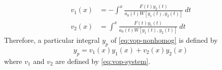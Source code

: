 \begin{equation}
    \boxed{ 
    \begin{split}
        v_1(x) &= - \int^{x} { \frac{F(t)y_2(t)}{a_0(t)W[y_1(t),y_2(t)]} } \: d{t} \\
        v_2(x) &= \int^{x} { \frac{F(t)y_1(t)}{a_0(t)W[y_1(t),y_2(t)]} } \: d{t}
    \end{split}
    }
\end{equation}
Therefore, a particular integral $y_p$ of \eqref{eq:vop-nonhomog} is defined by \[
    y_p = v_1(x)y_1(x) + v_2(x)y_2(x)
\] where $v_1$ and $v_2$ are defined by \eqref{eq:vop-system}.


































